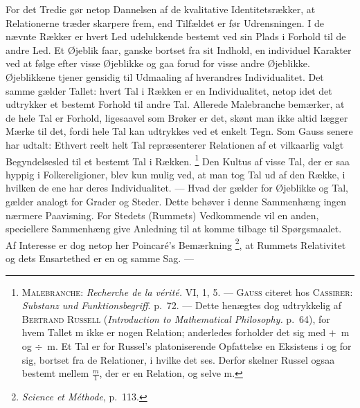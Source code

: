 \documentclass[12pt]{article}
\newcommand{\opage}[1]{\marginnote{\footnotesize\textit{[#1]}}}
\begin{document}
For det Tredie gør netop Dannelsen af de kvalitative Identitetsrækker,
at Relationerne træder skarpere frem, end Tilfældet er før Udrensningen.
I de nævnte Rækker er hvert Led udelukkende bestemt ved sin Plads i
Forhold til de andre Led. Et Øjeblik faar, ganske bortset fra sit
Indhold, en individuel Karakter ved at følge efter visse Øjeblikke og
gaa forud for visse andre Øjeblikke. Øjeblikkene tjener gensidig til
Udmaaling af hverandres Individualitet. Det samme gælder Tallet: hvert
Tal i Rækken er en Individualitet, netop idet det udtrykker et bestemt
Forhold til andre Tal. Allerede Malebranche bemærker, at de hele Tal er
Forhold, ligesaavel som Brøker er det, skønt man ikke altid lægger
Mærke til det, fordi hele Tal kan udtrykkes ved et enkelt Tegn. Som
Gauss senere har udtalt: \guillemotright Ethvert reelt helt Tal
repræsenterer Relationen af et vilkaarlig valgt Begyndelsesled til et
bestemt Tal i Rækken\guillemotleft .%
\footnote{\textsc{Malebranche}: \textit{Recherche de la vérité.} VI, 1,
5. --- \textsc{Gauss} citeret hos \textsc{Cassirer}: \textit{Substanz und
Funktionsbegriff}. p.~72. --- Dette henægtes dog udtrykkelig af
\textsc{Bertrand Russell} (\textit{Introduction to Mathematical
Philosophy.} p.~64), for hvem Tallet m ikke er nogen Relation;
anderledes forholder det sig med $+$~m og $\div$~m. Et Tal er for
Russel's platoniserende Opfattelse en Eksistens i og for sig, bortset fra
de Relationer, i hvilke det ses. Derfor skelner Russel ogsaa bestemt
mellem $\frac{m}{1}$, der er en Relation, og selve m.} Den Kultus af
visse Tal, der er saa hyppig i Folkereligioner, blev kun mulig ved, at
man tog Tal ud af den Række, i hvilken de ene har deres Individualitet.
--- Hvad der gælder for Øjeblikke og Tal, gælder analogt for Grader og
Steder. Dette behøver i denne Sammenhæng ingen nærmere Paavisning. For
Stedets (Rummets) Vedkommende vil en anden, speciellere Sammenhæng give
Anledning til at
\opage{44} \setcounter{footnote}{0}
komme tilbage til Spørgsmaalet. Af Interesse er dog netop her
Poincaré's Bemærkning%
\footnote{\textit{Science et Méthode}, p.~113.}, at Rummets Relativitet
og dets Ensartethed er en og samme Sag. ---
\end{document}

